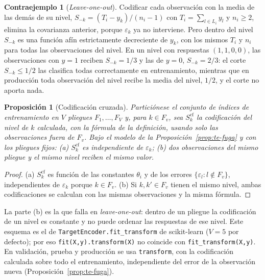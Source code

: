\documentclass[11pt,a4paper]{article}
\theoremstyle{plain}
\newtheorem{proposicion}[teorema]{Proposición}
\theoremstyle{definition}
\newtheorem{contraejemplo}[teorema]{Contraejemplo}
\theoremstyle{remark}
\newcommand{\1}{\mathbf{1}}
\begin{document}
\begin{contraejemplo}[\emph{Leave-one-out}]
Codificar cada observación con la media de las demás de su nivel,
$S_{-k}=(T_i-y_k)/(n_i-1)$ con $T_i=\sum_{l\in L_i}y_l$ y $n_i\ge2$,
elimina la covarianza anterior, porque $\varepsilon_k$ ya no interviene.
Pero dentro del nivel $S_{-k}$ es una función afín estrictamente
decreciente de $y_k$, con los mismos $T_i$ y $n_i$ para todas las
observaciones del nivel. En un nivel con respuestas $(1,1,0,0)$, las
observaciones con $y=1$ reciben $S_{-k}=1/3$ y las de $y=0$, $S_{-k}=2/3$:
el corte $S_{-k}\le1/2$ las clasifica todas correctamente en
entrenamiento, mientras que en producción toda observación del nivel
recibe la media del nivel, $1/2$, y el corte no aporta nada.
\end{contraejemplo}

\begin{proposicion}[Codificación cruzada]\label{prop:crossfit}
Particiónese el conjunto de índices de entrenamiento en $V$ pliegues
$F_1,\dots,F_V$ y, para $k\in F_v$, sea $S^{\mathrm{cf}}_k$ la codificación
del nivel de $k$ calculada, con la fórmula de la definición, usando solo las
observaciones fuera de $F_v$. Bajo el modelo de la
Proposición~\ref{prop:te-fuga} y con los pliegues fijos:
(a) $S^{\mathrm{cf}}_k$ es independiente de $\varepsilon_k$; (b) dos
observaciones del mismo pliegue y el mismo nivel reciben el mismo valor.
\end{proposicion}

\begin{proof}
(a) $S^{\mathrm{cf}}_k$ es función de las constantes $\theta_i$ y de los
errores $\{\varepsilon_l:l\notin F_v\}$, independientes de
$\varepsilon_k$ porque $k\in F_v$. (b) Si $k,k'\in F_v$ tienen el mismo
nivel, ambas codificaciones se calculan con las mismas observaciones y la
misma fórmula.
\end{proof}

La parte (b) es la que falla en \emph{leave-one-out}: dentro de un pliegue
la codificación de un nivel es constante y no puede ordenar las respuestas
de ese nivel. Este esquema es el de \texttt{TargetEncoder.fit\_transform}
de scikit-learn ($V=5$ por defecto); por eso \texttt{fit(X,y).transform(X)}
no coincide con \texttt{fit\_transform(X,y)}. En validación, prueba y
producción se usa \texttt{transform}, con la codificación calculada sobre
todo el entrenamiento, independiente del error de la observación nueva
(Proposición~\ref{prop:te-fuga}).
\end{document}
